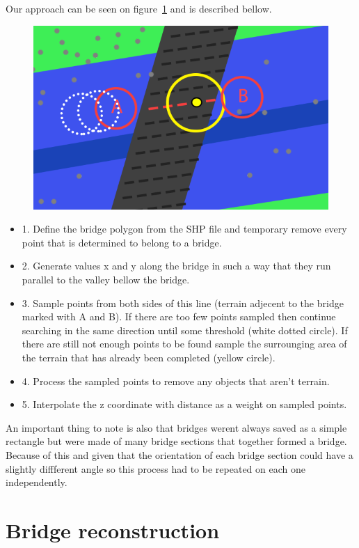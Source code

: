 \documentclass{egpubl-eurovis-star}
\begin{document}
Our approach can be seen on figure~\ref{fig2} and is described bellow.
\begin{figure}[ht]
    \centering
    \includegraphics[width=1\columnwidth]{bridge.png}
    \caption{ }
    \label{fig2}
\end{figure}
\begin{itemize}
\item{1. Define the bridge polygon from the SHP file and temporary remove every point that is determined to belong to a bridge.}
\item{2. Generate values x and y along the bridge in such a way that they run parallel to the valley bellow the bridge. }
\item{3. Sample points from both sides of this line (terrain adjecent to the bridge marked with A and B). 
If there are too few points sampled then continue searching in the same direction until some threshold (white dotted circle).
If there are still not enough points to be found sample the surrounging area of the terrain that has already been completed (yellow circle).}
\item{4. Process the sampled points to remove any objects that aren't terrain.}
\item{5. Interpolate the z coordinate with distance as a weight on sampled points.}
\end{itemize}

An important thing to note is also that bridges werent always saved as a simple rectangle but were made of many bridge sections that together formed a bridge.
Because of this and given that the orientation of each bridge section could have a slightly diffferent angle so this process had to be repeated on each one independently.

\section{Bridge reconstruction}
\end{document}
